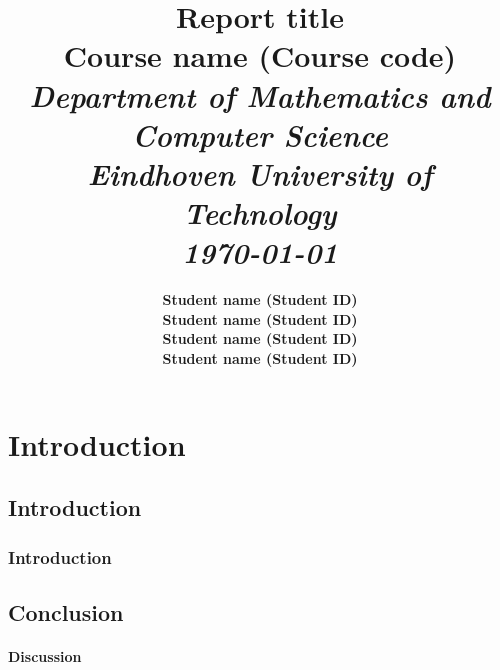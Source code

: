 \documentclass[11pt]{template/report} %
\title{\textbf{Report title} \\[0.5cm]
{\Large Course name (Course code) \\[1.0cm]
         \large \textit{Department of Mathematics and Computer Science \\[0.3cm]
                Eindhoven University of Technology \\[0.6cm]
         \small \today}}}
\author{\textbf{
            Student name (Student ID)\\[0.1cm]
            Student name (Student ID)\\[0.1cm]
            Student name (Student ID)\\[0.1cm]
            Student name (Student ID)}}
\begin{document}
\thispagestyle{empty}

\maketitle
\newpage

\section{Introduction}
    
    \lipsum[1]
    
    \subsection{Introduction}
    
        \lipsum[2-3]
        
        \subsubsection*{Introduction}
        
            \lipsum[4]
        
    \subsection{Conclusion}
    
        \lipsum[5]
        
        \paragraph{Discussion} \lipsum[6]
        
\newpage



\end{document}

